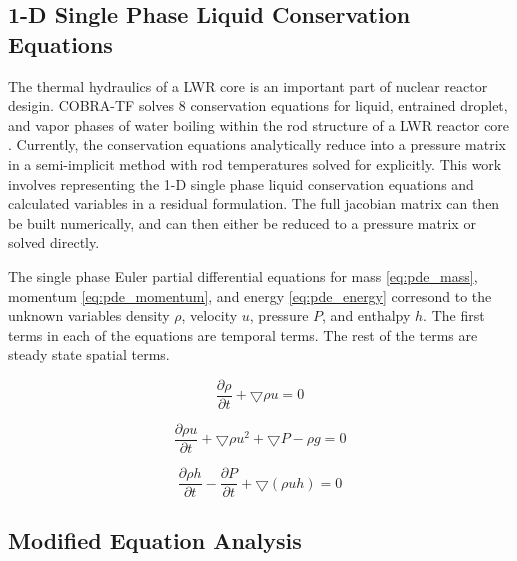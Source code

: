 \documentclass{mc2015}
\begin{document}
\subsection{1-D Single Phase Liquid Conservation Equations}

The thermal hydraulics of a LWR core is an important part of nuclear
reactor desigin. COBRA-TF solves 8 conservation equations for liquid,
entrained droplet, and vapor phases of water boiling within the rod structure
of a LWR reactor core \cite{CTF_Theory}. Currently, the conservation
equations analytically reduce into a pressure matrix in a semi-implicit
method with rod temperatures solved for explicitly. This work involves
representing the 1-D single phase liquid conservation equations and calculated 
variables in a residual formulation. The full jacobian matrix can then be
built numerically, and  can then either be reduced to a pressure matrix or
solved directly.

The single phase Euler partial differential equations for mass
\eqref{eq:pde_mass}, momentum \eqref{eq:pde_momentum}, and energy
\eqref{eq:pde_energy} corresond to the unknown variables density $\rho$,
velocity $u$, pressure $P$, and enthalpy $h$. The first terms in each of the
equations are temporal terms. The rest of the terms are steady state spatial
terms. 
    
    \begin{equation}
    	\label{eq:pde_mass}
    	\frac{ \partial \rho}{\partial t} + \bigtriangledown \rho u = 0
    \end{equation}
    
    \begin{equation}
    	\label{eq:pde_momentum}
    	\frac{ \partial \rho u}{\partial t} + \bigtriangledown \rho u^{2} +
    	\bigtriangledown P - \rho g  = 0
    \end{equation}
    
    \begin{equation}
    	\label{eq:pde_energy}
    	\frac{ \partial \rho h}{\partial t} -
    	\frac{ \partial  P}{\partial t} + 
    	\bigtriangledown ( \rho  u h )
    	= 0
    \end{equation}
    
\subsection{Modified Equation Analysis}
    
\end{document}
